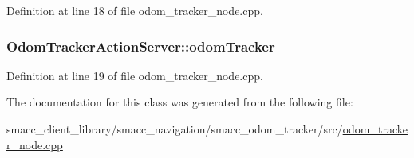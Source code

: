 Definition at line 18 of file odom\+\_\+tracker\+\_\+node.\+cpp.

\subsubsection[{\texorpdfstring{odom\+Tracker}{odomTracker}}]{ Odom\+Tracker\+Action\+Server\+::odom\+Tracker}\hypertarget{classOdomTrackerActionServer_a3e5c4328d3206fbd2fd2708f0aefe651}{}\label{classOdomTrackerActionServer_a3e5c4328d3206fbd2fd2708f0aefe651}


Definition at line 19 of file odom\+\_\+tracker\+\_\+node.\+cpp.



The documentation for this class was generated from the following file\+:\begin{DoxyCompactItemize}
\item 
smacc\+\_\+client\+\_\+library/smacc\+\_\+navigation/smacc\+\_\+odom\+\_\+tracker/src/\hyperlink{odom__tracker__node_8cpp}{odom\+\_\+tracker\+\_\+node.\+cpp}\end{DoxyCompactItemize}

